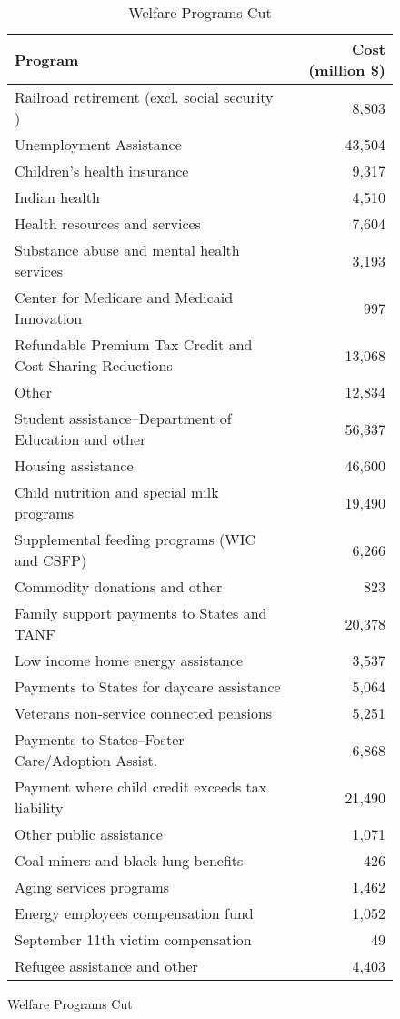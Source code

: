 \documentclass{article}
\begin{document}
\begin{figure}[H]
\singlespacing
\begin{table}[H]
\caption{Welfare Programs Cut}
\begin{center}
\begin{adjustbox}{max width=\textwidth}
\begin{tabular}{lr}
\toprule
Program & Cost (million \$) \\
\midrule
Railroad retirement (excl. social security ) & 8,803 \\
Unemployment Assistance & 43,504 \\
Children's health insurance & 9,317 \\
Indian health & 4,510 \\
Health resources and services & 7,604 \\
Substance abuse and mental health services & 3,193 \\
Center for Medicare and Medicaid Innovation & 997 \\
Refundable Premium Tax Credit and Cost Sharing Reductions & 13,068 \\
Other & 12,834 \\
Student assistance--Department of Education and other & 56,337 \\
Housing assistance & 46,600 \\
Child nutrition and special milk programs & 19,490 \\
Supplemental feeding programs (WIC and CSFP) & 6,266 \\
Commodity donations and other & 823 \\
Family support payments to States and TANF & 20,378 \\
Low income home energy assistance & 3,537 \\
Payments to States for daycare assistance & 5,064 \\
Veterans non-service connected pensions & 5,251 \\
Payments to States--Foster Care/Adoption Assist. & 6,868 \\
Payment where child credit exceeds tax liability & 21,490 \\
Other public assistance & 1,071 \\
Coal miners and black lung benefits & 426 \\
Aging services programs & 1,462 \\
Energy employees compensation fund & 1,052 \\
September 11th victim compensation & 49 \\
Refugee assistance and other & 4,403 \\

\end{tabular}
\end{adjustbox}
\end{center}
\end{table}
\end{figure}
\end{document}
